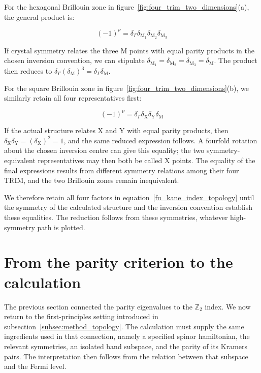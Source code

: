 For the hexagonal Brillouin zone in figure~\ref{fig:four_trim_two_dimensions}(a),
the general product is:

\begin{equation}
    (-1)^\nu
    =\delta_\Gamma\delta_{\mathrm{M}_1}
    \delta_{\mathrm{M}_2}\delta_{\mathrm{M}_3}
\label{hexagonal_trim_product_topology}
\end{equation}

If crystal symmetry relates the three $\mathrm{M}$ points with equal parity products in the chosen inversion convention,
we can stipulate $\delta_{\mathrm{M}_1}=\delta_{\mathrm{M}_2}=\delta_{\mathrm{M}_3}=\delta_\mathrm{M}$.
The product then reduces to $\delta_\Gamma(\delta_\mathrm{M})^3=\delta_\Gamma\delta_\mathrm{M}$.

For the square Brillouin zone in figure~\ref{fig:four_trim_two_dimensions}(b),
we similarly retain all four representatives first:

\begin{equation}
    (-1)^\nu
    =\delta_\Gamma\delta_\mathrm{X}\delta_\mathrm{Y}\delta_\mathrm{M}
\label{square_trim_product_topology}
\end{equation}

If the actual structure relates $\mathrm{X}$ and $\mathrm{Y}$ with equal parity products,
then $\delta_\mathrm{X}\delta_\mathrm{Y}=(\delta_\mathrm{X})^2=1$,
and the same reduced expression follows.
A fourfold rotation about the chosen inversion centre can give this equality;
the two symmetry-equivalent representatives may then both be called $\mathrm{X}$ points.
The equality of the final expressions results from different symmetry relations among their four TRIM,
and the two Brillouin zones remain inequivalent.

We therefore retain all four factors in equation~\eqref{fu_kane_index_topology} until the symmetry of the calculated structure
and the inversion convention establish these equalities.
The reduction follows from these symmetries, whatever high-symmetry path is plotted.

\newpage
\section{From the parity criterion to the calculation}
\label{sec:interpreting_topology_calculation}

The previous section connected the parity eigenvalues to the $\mathbb{Z}_2$ index.
We now return to the first-principles setting introduced in subsection~\ref{subsec:method_topology}.
The calculation must supply the same ingredients used in that connection, namely a specified spinor hamiltonian, the relevant symmetries, an isolated band subspace, and the parity of its Kramers pairs.
The interpretation then follows from the relation between that subspace and the Fermi level.

